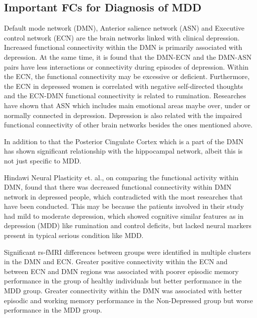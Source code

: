 \documentclass{article}
\begin{document}
\subsection{Important FCs for Diagnosis of MDD}

Default mode network (DMN), Anterior salience network (ASN) and
Executive control network (ECN) are the brain networks linked with
clinical depression. Increased functional connectivity within the DMN
is primarily associated with depression. At the same time, it is found
that the DMN-ECN and the DMN-ASN pairs have less interactions or
connectivity during episodes of depression. Within the ECN, the
functional connectivity may be excessive or deficient. Furthermore,
the ECN in depressed women is correlated with negative self-directed
thoughts and the ECN-DMN functional connectivity is related to
rumination.  Researches have shown that ASN which includes main
emotional areas maybe over, under or normally connected in depression.
Depression is also related with the impaired functional connectivity
of other brain networks besides the ones mentioned above.

In addition to that the Posterior Cingulate Cortex which is a part of
the DMN has shown significant relationship with the hippocampal
network, albeit this is not just specific to MDD.


Hindawi Neural Plasticity et. al., on comparing the functional
activity within DMN, found that there was decreased functional
connectivity within DMN network in depressed people, which
contradicted with the most researches that have been conducted. This
may be because the patients involved in their study had mild to
moderate depression, which showed cognitive similar features as in
depression (MDD) like rumination and control deficits, but lacked
neural markers present in typical serious condition like MDD.

Significant rs-fMRI differences between groups were identified in
multiple clusters in the DMN and ECN. Greater positive connectivity
within the ECN and between ECN and DMN regions was associated with
poorer episodic memory performance in the group of healthy individuals
but better performance in the MDD group. Greater connectivity within
the DMN was associated with better episodic and working memory
performance in the Non-Depressed group but worse performance in the
MDD group.
\end{document}
